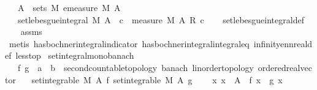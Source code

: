 \begin{isabellebody}
\ \ \ {\isachardoublequoteopen}A\ {\isasymin}\ sets\ M{\isachardoublequoteclose}\ {\isachardoublequoteopen}emeasure\ M\ A\ {\isasymnoteq}\ {\isasyminfinity}{\isachardoublequoteclose}\isanewline
\ \ \ {\isachardoublequoteopen}set{\isacharunderscore}{\kern0pt}lebesgue{\isacharunderscore}{\kern0pt}integral\ M\ A\ {\isacharparenleft}{\kern0pt}{\isasymlambda}{\isacharunderscore}{\kern0pt}{\isachardot}{\kern0pt}\ c{\isacharparenright}{\kern0pt}\ {\isacharequal}{\kern0pt}\ measure\ M\ A\ {\isacharasterisk}{\kern0pt}\isactrlsub R\ c{\isachardoublequoteclose}\isanewline
%
\isadelimproof
\ \ %
\endisadelimproof
%
\isatagproof
{}\isamarkupfalse%
\ set{\isacharunderscore}{\kern0pt}lebesgue{\isacharunderscore}{\kern0pt}integral{\isacharunderscore}{\kern0pt}def\ \isanewline
\ \ \isamarkupfalse%
\ assms\ \isamarkupfalse%
\ {\isacharparenleft}{\kern0pt}metis\ has{\isacharunderscore}{\kern0pt}bochner{\isacharunderscore}{\kern0pt}integral{\isacharunderscore}{\kern0pt}indicator\ has{\isacharunderscore}{\kern0pt}bochner{\isacharunderscore}{\kern0pt}integral{\isacharunderscore}{\kern0pt}integral{\isacharunderscore}{\kern0pt}eq\ infinity{\isacharunderscore}{\kern0pt}ennreal{\isacharunderscore}{\kern0pt}def\ less{\isacharunderscore}{\kern0pt}top{\isacharparenright}{\kern0pt}%
\endisatagproof
{\isafoldproof}%
%
\isadelimproof
\isanewline
%
\endisadelimproof
\isanewline
{}\isamarkupfalse%
\ set{\isacharunderscore}{\kern0pt}integral{\isacharunderscore}{\kern0pt}mono{\isacharunderscore}{\kern0pt}banach{\isacharcolon}{\kern0pt}\isanewline
\ \ \ f\ g\ {\isacharcolon}{\kern0pt}{\isacharcolon}{\kern0pt}\ {\isachardoublequoteopen}{\isacharprime}{\kern0pt}a\ {\isasymRightarrow}\ {\isacharprime}{\kern0pt}b\ {\isacharcolon}{\kern0pt}{\isacharcolon}{\kern0pt}\ {\isacharbraceleft}{\kern0pt}second{\isacharunderscore}{\kern0pt}countable{\isacharunderscore}{\kern0pt}topology{\isacharcomma}{\kern0pt}\ banach{\isacharcomma}{\kern0pt}\ linorder{\isacharunderscore}{\kern0pt}topology{\isacharcomma}{\kern0pt}\ ordered{\isacharunderscore}{\kern0pt}real{\isacharunderscore}{\kern0pt}vector{\isacharbraceright}{\kern0pt}{\isachardoublequoteclose}\isanewline
\ \ \ {\isachardoublequoteopen}set{\isacharunderscore}{\kern0pt}integrable\ M\ A\ f{\isachardoublequoteclose}\ {\isachardoublequoteopen}set{\isacharunderscore}{\kern0pt}integrable\ M\ A\ g{\isachardoublequoteclose}\isanewline
\ \ \ \ {\isachardoublequoteopen}{\isasymAnd}x{\isachardot}{\kern0pt}\ x\ {\isasymin}\ A\ {\isasymLongrightarrow}\ f\ x\ {\isasymle}\ g\ x{\isachardoublequoteclose}\isanewline

\end{isabellebody}

